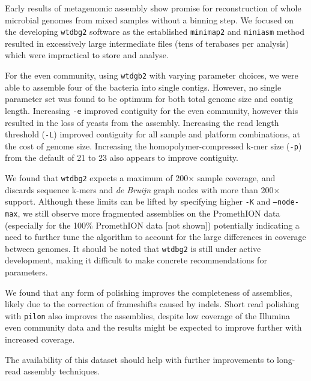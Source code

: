 \documentclass[a4paper,num-refs]{oup-contemporary}
\begin{document}
Early results of metagenomic assembly show promise for reconstruction of whole microbial genomes from mixed samples without a binning step. We focused on the developing \texttt{wtdbg2} software as the established \texttt{minimap2} and \texttt{miniasm} method resulted in excessively large intermediate files (tens of terabases per analysis) which were impractical to store and analyse. 

For the even community, using \texttt{wtdgb2} with varying parameter choices, we were able to assemble four of the bacteria into single contigs. However, no single parameter set was found to be optimum for both total genome size and contig length.
Increasing \texttt{-e} improved contiguity for the even community, however this resulted in the loss of yeasts from the assembly. Increasing the read length threshold (\texttt{-L}) improved contiguity for all sample and platform combinations, at the cost of genome size. Increasing the homopolymer-compressed k-mer size (\texttt{-p}) from the default of 21 to 23 also appears to improve contiguity. 

We found that \texttt{wtdbg2} expects a maximum of 200$\times$ sample coverage, and discards sequence k-mers and \textit{de Bruijn} graph nodes with more than 200$\times$ support. Although these limits can be lifted by specifying higher \texttt{-K} and \texttt{--node-max}, we still observe more fragmented assemblies on the PromethION data (especially for the 100\% PromethION data [not shown]) potentially indicating a need to further tune the algorithm to account for the large differences in coverage between genomes.
It should be noted that \texttt{wtdbg2} is still under active development, making it difficult to make concrete recommendations for parameters.

We found that any form of polishing improves the completeness of assemblies, likely due to the correction of frameshifts caused by indels.
Short read polishing with \texttt{pilon} also improves the assemblies, despite low coverage of the Illumina even community data and the results might be expected to improve further with increased coverage.

The availability of this dataset should help with further improvements to long-read assembly techniques.


\end{document}
